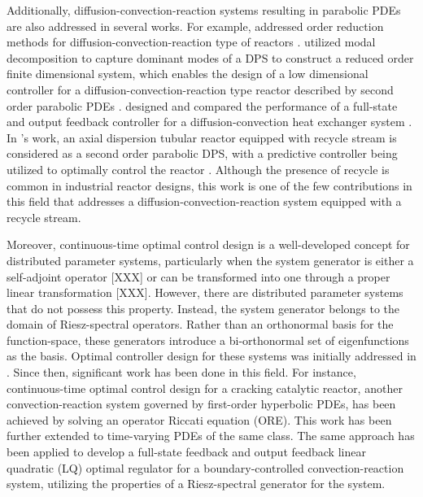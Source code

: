 Additionally, diffusion-convection-reaction systems resulting in parabolic PDEs are also addressed in several works. For example,  addressed order reduction methods for diffusion-convection-reaction type of reactors \autocite{Christofides2012book}.  utilized modal decomposition to capture dominant modes of a DPS to construct a reduced order finite dimensional system, which enables the design of a low dimensional controller for a diffusion-convection-reaction type reactor described by second order parabolic PDEs \autocite{dubljevic2006predictive2}.  designed and compared the performance of a full-state and output feedback controller for a diffusion-convection heat exchanger system \autocite{ozorio2019heat}. In 's work, an axial dispersion tubular reactor equipped with recycle stream is considered as a second order parabolic DPS, with a predictive controller being utilized to optimally control the reactor \autocite{khatibi2021model}.  Although the presence of recycle is common in industrial reactor designs, this work is one of the few contributions in this field that addresses a diffusion-convection-reaction system equipped with a recycle stream.

Moreover, continuous-time optimal control design is a well-developed concept for distributed parameter systems, particularly when the system generator is either a self-adjoint operator [XXX] or can be transformed into one through a proper linear transformation [XXX]. However, there are distributed parameter systems that do not possess this property. Instead, the system generator belongs to the domain of Riesz-spectral operators. Rather than an orthonormal basis for the function-space, these generators introduce a bi-orthonormal set of eigenfunctions as the basis. Optimal controller design for these systems was initially addressed in  \autocite{curtainbook}. Since then, significant work has been done in this field. For instance, continuous-time optimal control design for a cracking catalytic reactor, another convection-reaction system governed by first-order hyperbolic PDEs, has been achieved by solving an operator Riccati equation (ORE)\autocite{aksikas2009lq}. This work has been further extended to time-varying PDEs of the same class\autocite{aksikas2013optimal}. The same approach has been applied to develop a full-state feedback\autocite{mohammadi2012lq} and output feedback\autocite{aksikas2024spectral} linear quadratic (LQ) optimal regulator for a boundary-controlled convection-reaction system, utilizing the properties of a Riesz-spectral generator for the system.


